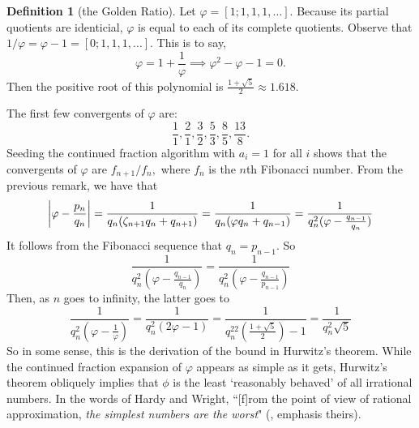 \documentclass[12pt, letterpaper, oneside]{book}
\newcommand{\gf}{\ensuremath{\varphi}}
\newcommand{\gz}{\ensuremath{\zeta}}
\DeclarePairedDelimiter{\abs}{\lvert}{\rvert}
\theoremstyle{plain}
\theoremstyle{definition}
\newtheorem{definition}{Definition}
\theoremstyle{remark}
\begin{document}
\begin{definition}[the Golden Ratio]
  Let $\gf = [1; 1, 1,1,\ldots]$. Because its partial quotients are identicial, $\gf$ is equal to each
  of its complete quotients.  Observe that
  $1/\gf = \gf - 1 = [0; 1, 1, 1,\ldots]$. This is to say,
  \[
    \gf = 1 + \frac{1}{\gf} \implies \gf^2 - \gf - 1 = 0.
  \]
  Then the positive root of this polynomial is
  $\frac{1 + \sqrt{5}}{2} \approx 1.618$.
\end{definition}
The first few convergents of $\gf$ are:
\[
\frac{1}{1},\frac{2}{1},\frac{3}{2},\frac{5}{3},\frac{8}{5},\frac{13}{8}.
\]
Seeding the continued fraction algorithm with $a_i=1$ for all $i$ shows that the convergents of $\gf$ are $f_{n+1}/f_n,$ where $f_n$ is the $n$th Fibonacci number. From the previous remark, we have that
  \[
    \abs*{\gf - \frac{p_n}{q_n}} =
    \frac{1}{q_n(\gz_{n+1}q_n+q_{n+1})}=\frac{1}{q_n(\gf q_n +
      q_{n-1})} = \frac{1}{q_n^2(\gf - \frac{q_{n-1}}{q_n})}
  \]
It follows from the Fibonacci sequence that $q_n = p_{n-1}$.  So
  \[
    \frac{1}{q_n^2(\gf - \frac{q_{n-1}}{q_n})} = \frac{1}{q_n^2(\gf -
      \frac{q_{n-1}}{p_{n-1}})}
  \]
  Then, as $n$ goes to infinity, the latter goes to
  \[
    \frac{1}{q_n^2(\gf - \frac{1}{\gf})} = \frac{1}{q_n^2(2\gf - 1)} =
    \frac{1}{q_n^22(\frac{1+\sqrt{5}}{2})-1}=\frac{1}{q_n^2\sqrt{5}}
  \]
  So in some sense, this is the derivation of the bound in Hurwitz's theorem. While the continued fraction expansion of $\gf$ appears as simple as it gets, Hurwitz's theorem obliquely implies that $\phi$ is the least `reasonably behaved' of all irrational numbers. In the words of Hardy and Wright, ``[f]rom the point of view of rational approximation, \textit{the simplest numbers are the worst}" (\cite{GH60}, emphasis theirs).
\end{document}

